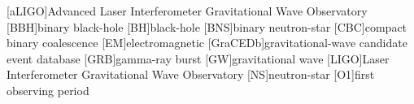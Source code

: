 [aLIGO]{Advanced Laser Interferometer Gravitational Wave Observatory}
[BBH]{binary black-hole}
[BH]{black-hole}
[BNS]{binary neutron-star}
[CBC]{compact binary coalescence}
[EM]{electromagnetic}
[GraCEDb]{gravitational-wave candidate event database}
[GRB]{gamma-ray burst}
[GW]{gravitational wave}
[LIGO]{Laser Interferometer Gravitational Wave Observatory}
[NS]{neutron-star}
[O1]{first observing period}

